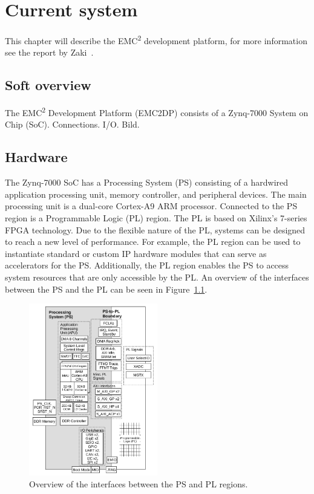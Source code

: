 \chapter{Current system}
\label{sec:lit_emc2mcs}
This chapter will describe the EMC\textsuperscript{2} development platform, for more information see the report by Zaki~\cite{zaki2016}.

\section{Soft overview}
The EMC\textsuperscript{2} Development Platform (EMC2DP) consists of a Zynq-7000 System on Chip (SoC). Connections. I/O. Bild.

\section{Hardware}
The Zynq-7000 SoC has a Processing System (PS) consisting of a hardwired application processing unit, memory controller, and peripheral devices. The main processing unit is a dual-core Cortex-A9 ARM processor. Connected to the PS region is a Programmable Logic (PL) region. The PL is based on Xilinx’s 7-series FPGA technology. 
Due to the flexible nature of the PL, systems can be designed to reach a new level of performance. For example, the PL region can be used to instantiate standard or custom IP hardware modules that can serve as accelerators for the PS. Additionally, the PL region enables the PS to access system resources that are only accessible by the PL. %
An overview of the interfaces between the PS and the PL can be seen in Figure~\ref{fig:interface}.

\begin{figure}[H]
\centering
\includegraphics[width=0.5\textwidth]{./img/literature_interface.png}
\caption{Overview of the interfaces between the PS and PL regions.\cite{zaki2016}}\label{fig:interface}
\end{figure}

